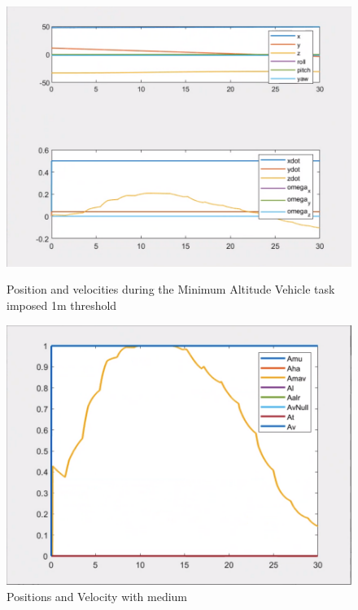 \documentclass{article}
\begin{document}
\begin{figure}[htpb] 
\begin{minipage}{0.40\textwidth}  
\includegraphics[width=\textwidth]{123_1m_ppdot.png}
\caption{Position and velocities during the Minimum Altitude Vehicle task imposed 1m threshold}\label{1m_ppdot} 
\end{minipage}  
\hspace{0.2\textwidth} 
\begin{minipage}{0.40\textwidth}  
\includegraphics[width=\textwidth]{123_1m_A.png}
\caption{Positions and Velocity with medium}\label{1m_A} 
\end{minipage} 
\end{figure}
\end{document}
